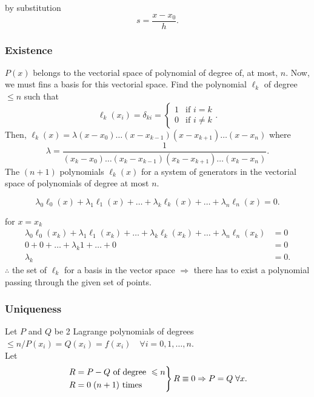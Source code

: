 \documentclass{report}
\begin{document}
by substitution
\[
	s = \frac{x-x_0}{h}
	.\]

\subsubsection{Existence}

\begin{myproof}
	$P(x)$ belongs to the vectorial space of polynomial of degree of, at most, $n$. Now, we must fins a basis for this vectorial space. Find the polynomial $\ell_k$ of degree $\leq n$ such that
	\[
		\ell_k(x_i) = \delta_{ki} = \begin{cases}
			1 & \text{if }i=k     \\
			0 & \text{if }i\neq k
		\end{cases}
		.\]
	Then, $\ell_k(x) = \lambda(x-x_0)\dots(x-x_{k-1})(x-x_{k+1})\dots(x-x_n)$
	where
	\[
		\lambda = \frac{1}{(x_k-x_0)\dots(x_k-x_{k-1})(x_k-x_{k+1})\dots(x_k-x_n)}
		.\]
	The $(n+1)$ polynomials $\ell_k(x)$ for a system of generators in the vectorial space of polynomials of degree at most $n$.

	\[
		\lambda_0\ell_0(x) + \lambda_1\ell_1(x) + \dots + \lambda_k\ell_k(x) + \dots + \lambda_n\ell_n(x) = 0
		.\]

	for $x=x_k$
	\begin{align*}
		\lambda_0\ell_0(x_k) + \lambda_1\ell_1(x_k) + \dots + \lambda_k\ell_k(x_k) + \dots + \lambda_n\ell_n(x_k) & = 0 \\
		0+0+\dots+\lambda_k1+\dots+0                                                                              & = 0 \\
		\lambda_k                                                                                                 & = 0
		.\end{align*}
	$\therefore$ the set of $\ell_k$ for a basis in the vector space $\Rightarrow$ there has to exist a polynomial passing through the given set of points.

\end{myproof}


\subsubsection{Uniqueness}

\begin{myproof}
	Let $P$ and $Q$ be 2 Lagrange polynomials of degrees $\leq n\Big/P(x_i)=Q(x_i)=f(x_i)\quad\forall i = 0,1,\dots,n$.\\
	Let
	\[
		\begin{rcases}
			R=P-Q \text{ of degree }\leq n \\
			R=0 \; (n+1) \text{ times}
		\end{rcases}R\equiv0\Rightarrow P=Q\;\forall x
		.\]
\end{myproof}
\end{document}
